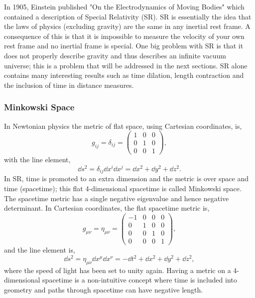 In 1905, Einstein published "On the Electrodynamics of Moving Bodies" \cite{einstein1905electrodynamics} which contained a description of Special Relativity (SR). SR is essentially the idea that the laws of physics (excluding gravity) are the same in any inertial rest frame. A consequence of this is that it is impossible to measure the velocity of your own rest frame and no inertial frame is special. One big problem with SR is that it does not properly describe gravity and thus describes an infinite vacuum universe; this is a problem that will be addressed in the next sections. SR alone contains many interesting results such as time dilation, length contraction and the inclusion of time in distance measures. 

\subsubsection{Minkowski Space}\label{intro:sec:minkowski_space}
In Newtonian physics the metric of flat space, using Cartesian coordinates, is, 
\begin{equation}
g_{ij} = \delta_{ij} = \begin{pmatrix} 1 & 0 & 0 \\ 0 & 1 & 0 \\ 0 & 0 & 1 \end{pmatrix},
\end{equation}
with the line element,
\begin{equation}
\dd s ^2 = \delta_{ij} \dd x^i \dd x^j = \dd x^2 + \dd y^2 + \dd z^2.
\end{equation}
In SR, time is promoted to an extra dimension and the metric is over space and time (spacetime); this flat 4-dimensional spacetime is called Minkowski space. The spacetime metric has a single negative eigenvalue and hence negative determinant. In Cartesian coordinates, the flat spacetime metric is,
\begin{equation}
g_{\mu\nu} = \eta_{\mu\nu} = \begin{pmatrix} -1 &0 &0 &0\\ 0 & 1 & 0 & 0 \\ 0 & 0 & 1 & 0 \\ 0 & 0 & 0 & 1 \end{pmatrix},
\end{equation}
and the line element is,
\begin{equation}
\dd s ^2 = \eta_{\mu\nu} \dd x^\mu \dd x^\nu = -\dd t^2 + \dd x^2 + \dd y^2 + \dd z^2,
\end{equation}
where the speed of light has been set to unity again. Having a metric on a 4-dimensional spacetime is a non-intuitive concept where time is included into geometry and paths through spacetime can have negative length.

